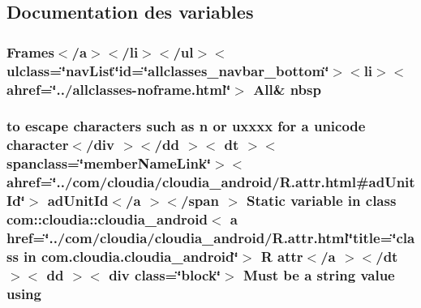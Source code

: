 \subsection{Documentation des variables}
\hypertarget{index-1_8html_a479d00f21dbca369efe3be97f1ef785a}{
\subsubsection[{nbsp}]{\setlength{\rightskip}{0pt plus 5cm}Frames$<$/{\bf a}$>$$<$/li$>$$<$/ul$>$$<$ulclass=\char`\"{}nav\-List\char`\"{}id=\char`\"{}allclasses\-\_\-navbar\-\_\-bottom\char`\"{}$>$$<$li$>$$<$ahref=\char`\"{}../allclasses-\/noframe.\-html\char`\"{}$>$ All\& nbsp}}\label{index-1_8html_a479d00f21dbca369efe3be97f1ef785a}
\hypertarget{index-1_8html_a5f4599a371f5b6212251232346562e03}{
\subsubsection[{using}]{\setlength{\rightskip}{0pt plus 5cm}to escape characters such as {\bf n} or uxxxx for {\bf a} unicode character$<$/div $>$$<$/{\bf dd} $>$$<$ {\bf dt} $>$$<$ spanclass=\char`\"{}member\-Name\-Link\char`\"{}$>$$<$ ahref=\char`\"{}../com/cloudia/cloudia\-\_\-android/R.\-attr.\-html\#ad\-Unit\-Id\char`\"{}$>$ ad\-Unit\-Id$<$/{\bf a} $>$$<$/{\bf span} $>$ Static variable in {\bf class} com\-::cloudia\-::cloudia\-\_\-android$<$ {\bf a} href=\char`\"{}../com/cloudia/cloudia\-\_\-android/R.\-attr.\-html\char`\"{}title=\char`\"{}class in com.\-cloudia.\-cloudia\-\_\-android\char`\"{}$>$ R attr$<$/{\bf a} $>$$<$/{\bf dt} $>$$<$ {\bf dd} $>$$<$ div {\bf class}=\char`\"{}block\char`\"{}$>$ Must be {\bf a} {\bf string} {\bf value} using}}\label{index-1_8html_a5f4599a371f5b6212251232346562e03}
